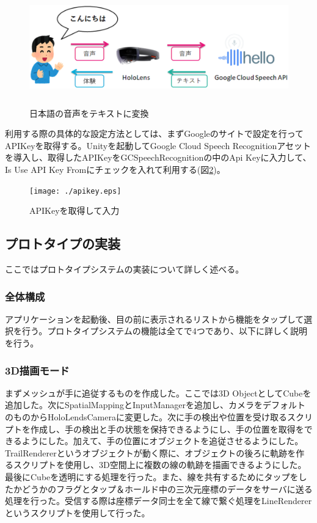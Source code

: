 \documentclass[11pt,a4j, titlepage]{jarticle} %
\begin{document}
\begin{figure}[H]
  \begin{center}
    \includegraphics[clip,height=5.0cm,width=14.0cm]{./googlespeech.eps}
    \caption{日本語の音声をテキストに変換}
    \label{fig:googlespeech}
  \end{center}
\end{figure}

利用する際の具体的な設定方法としては、まずGoogleのサイトで設定を行ってAPIKeyを取得する\cite{googlesetting}。Unityを起動してGoogle Cloud Speech Recognitionアセット\cite{speechrecognition}を導入し、取得したAPIKeyをGCSpeechRecognitionの中のApi Keyに入力して、Is Use API Key Fromにチェックを入れて利用する(図\ref{fig:apikey})。

\begin{figure}[H]
  \begin{center}
    \texttt{[image: ./apikey.eps]}
    \caption{APIKeyを取得して入力}
    \label{fig:apikey}
  \end{center}
\end{figure}

\subsection{プロトタイプの実装}
ここではプロトタイプシステムの実装について詳しく述べる。

\subsubsection{全体構成}
アプリケーションを起動後、目の前に表示されるリストから機能をタップして選択を行う。プロトタイプシステムの機能は全てで4つであり、以下に詳しく説明を行う。

\subsubsection{3D描画モード}
まずメッシュが手に追従するものを作成した。ここでは3D ObjectとしてCubeを追加した。次にSpatialMappingとInputManagerを追加し、カメラをデフォルトのものからHoloLendsCameraに変更した。次に手の検出や位置を受け取るスクリプトを作成し、手の検出と手の状態を保持できるようにし、手の位置を取得をできるようにした。加えて、手の位置にオブジェクトを追従させるようにした。TrailRenderer\cite{trailrenderer}というオブジェクトが動く際に、オブジェクトの後ろに軌跡を作るスクリプトを使用し、3D空間上に複数の線の軌跡を描画できるようにした。最後にCubeを透明にする処理を行った。また、線を共有するためにタップをしたかどうかのフラグとタップ＆ホールド中の三次元座標のデータをサーバに送る処理を行った。受信する際は座標データ同士を全て線で繋ぐ処理をLineRenderer\cite{linerenderer}というスクリプトを使用して行った。
\end{document}
